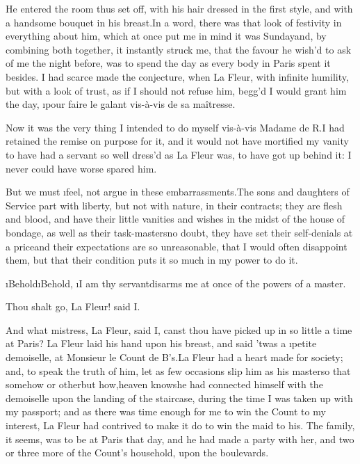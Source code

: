 \documentclass[twoside]{article}
\begin{document}
He entered the room thus set off, with his
hair dressed in the first style, and with
a handsome bouquet in his breast.\tskk In
a word, there was that look of festivity
in everything about him, which at once put
me in mind it was Sunday\tskk and, by
combining both together, it instantly
struck me, that the favour he wish’d to
ask of me the night before, was to spend
the day as every body in Paris spent it
besides.  I had scarce made the
conjecture, when La Fleur, with infinite
humility, but with a look of trust, as if
I should not refuse him, begg’d I would
grant him the day, \i{pour faire le galant
vis-à-vis de sa maîtresse}.

Now it was the very thing I intended to do
myself vis-à-vis Madame de R\anon .\tskk I
had retained the remise on purpose for it,
and it would not have mortified my vanity
to have had a servant so well dress’d as
La Fleur was, to have got up behind it: I
never could have worse spared him.

But we must \i{feel}, not argue in these
embarrassments.\tskk The sons and
daughters of Service part with liberty,
but not with nature, in their contracts;
they are flesh and blood, and have their
little vanities and wishes in the midst of
the house of bondage, as well as their
task-masters\tskk no doubt, they have set
their self-denials at a price\tskk and
their expectations are so unreasonable,
that I would often disappoint them, but
that their condition puts it so much in my
power to do it.

\i{Behold}\tskk \i{Behold}, \i{I am thy
servant}\tskk disarms me at once of the
powers of a master.\tskk 

Thou shalt go, La Fleur! said I.

\tskk And what mistress, La Fleur, said I,
canst thou have picked up in so little a
time at Paris?  La Fleur laid his hand
upon his breast, and said ’twas a
\i{petite demoiselle}, at Monsieur le
Count de B\anon’s.\tskk La Fleur had a
heart made for society; and, to speak the
truth of him, let as few occasions slip
him as his master\tskk so that somehow or
other\tskk but how,\tskk heaven
knows\tskk he had connected himself with
the demoiselle upon the landing of the
staircase, during the time I was taken up
with my passport; and as there was time
enough for me to win the Count to my
interest, La Fleur had contrived to make
it do to win the maid to his.  The family,
it seems, was to be at Paris that day, and
he had made a party with her, and two or
three more of the Count’s household, upon
the boulevards.
\end{document}
